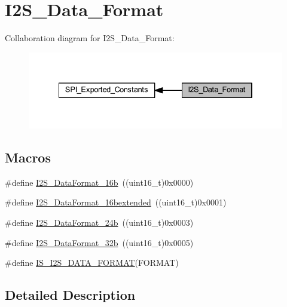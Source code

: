 \hypertarget{group___i2_s___data___format}{}\section{I2\+S\+\_\+\+Data\+\_\+\+Format}
\label{group___i2_s___data___format}
Collaboration diagram for I2\+S\+\_\+\+Data\+\_\+\+Format\+:
\nopagebreak
\begin{figure}[H]
\begin{center}
\leavevmode
\includegraphics[width=334pt]{group___i2_s___data___format}
\end{center}
\end{figure}
\subsection*{Macros}
\begin{DoxyCompactItemize}
\item 
\#define \hyperlink{group___i2_s___data___format_gabcd7cb799b68346a735709cc135bd414}{I2\+S\+\_\+\+Data\+Format\+\_\+16b}~((uint16\+\_\+t)0x0000)
\item 
\#define \hyperlink{group___i2_s___data___format_gae44b9704c9e393d5abec9bf4fcfe1116}{I2\+S\+\_\+\+Data\+Format\+\_\+16bextended}~((uint16\+\_\+t)0x0001)
\item 
\#define \hyperlink{group___i2_s___data___format_ga5a959486671cf00c5a734f1df205581b}{I2\+S\+\_\+\+Data\+Format\+\_\+24b}~((uint16\+\_\+t)0x0003)
\item 
\#define \hyperlink{group___i2_s___data___format_ga6be3bdcc713cb92a9ad247de013a5e37}{I2\+S\+\_\+\+Data\+Format\+\_\+32b}~((uint16\+\_\+t)0x0005)
\item 
\#define \hyperlink{group___i2_s___data___format_gac467da829eca4a5c4ce41a6abd2d8e81}{I\+S\+\_\+\+I2\+S\+\_\+\+D\+A\+T\+A\+\_\+\+F\+O\+R\+M\+AT}(F\+O\+R\+M\+AT)
\end{DoxyCompactItemize}


\subsection{Detailed Description}


